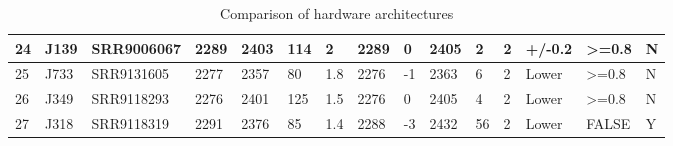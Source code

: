 \documentclass[a4paper]{paper}
\begin{document}
\begin{table}[htp]
\begin{tabular}{p{3cm}llllllllllllll}
\multicolumn{1}{|l|}{24} & \multicolumn{1}{l|}{J139} & \multicolumn{1}{l|}{SRR9006067} & \multicolumn{1}{l|}{2289} & \multicolumn{1}{l|}{2403} & \multicolumn{1}{l|}{114} & \multicolumn{1}{l|}{2} & \multicolumn{1}{l|}{2289} & \multicolumn{1}{l|}{0} & \multicolumn{1}{l|}{2405} & \multicolumn{1}{l|}{2} & \multicolumn{1}{l|}{2} & \multicolumn{1}{l|}{+/-0.2} & \multicolumn{1}{l|}{\textgreater{}=0.8} & \multicolumn{1}{l|}{N} \\ \hline
\multicolumn{1}{|l|}{25} & \multicolumn{1}{l|}{J733} & \multicolumn{1}{l|}{SRR9131605} & \multicolumn{1}{l|}{2277} & \multicolumn{1}{l|}{2357} & \multicolumn{1}{l|}{80} & \multicolumn{1}{l|}{1.8} & \multicolumn{1}{l|}{2276} & \multicolumn{1}{l|}{-1} & \multicolumn{1}{l|}{2363} & \multicolumn{1}{l|}{6} & \multicolumn{1}{l|}{2} & \multicolumn{1}{l|}{Lower} & \multicolumn{1}{l|}{\textgreater{}=0.8} & \multicolumn{1}{l|}{N} \\ \hline
\multicolumn{1}{|l|}{26} & \multicolumn{1}{l|}{J349} & \multicolumn{1}{l|}{SRR9118293} & \multicolumn{1}{l|}{2276} & \multicolumn{1}{l|}{2401} & \multicolumn{1}{l|}{125} & \multicolumn{1}{l|}{1.5} & \multicolumn{1}{l|}{2276} & \multicolumn{1}{l|}{0} & \multicolumn{1}{l|}{2405} & \multicolumn{1}{l|}{4} & \multicolumn{1}{l|}{2} & \multicolumn{1}{l|}{Lower} & \multicolumn{1}{l|}{\textgreater{}=0.8} & \multicolumn{1}{l|}{N} \\ \hline
27 & J318 & SRR9118319 & 2291 & 2376 & 85 & 1.4 & 2288 & -3 & 2432 & 56 & 2 & Lower & FALSE & Y \\ \hline
\end{tabular}
\caption{Comparison of hardware architectures}
\label{tab:hard}
\end{table}
\end{document}
